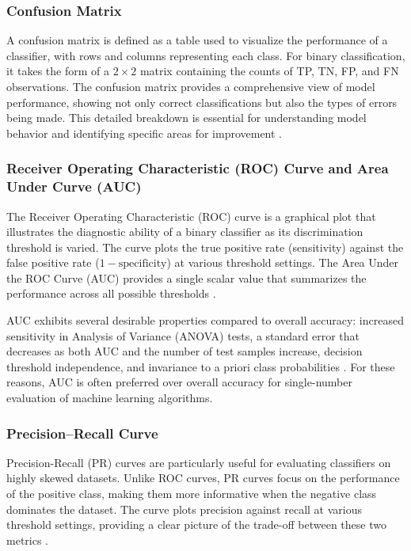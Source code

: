 \documentclass[12pt, a4paper]{report}
\begin{document}
\subsubsection{Confusion Matrix}
A confusion matrix is defined as a table used to visualize the performance of a classifier, with rows and columns representing each class. For binary classification, it takes the form of a $2 \times 2$ matrix containing the counts of TP, TN, FP, and FN observations. The confusion matrix provides a comprehensive view of model performance, showing not only correct classifications but also the types of errors being made. This detailed breakdown is essential for understanding model behavior and identifying specific areas for improvement .

\subsubsection{Receiver Operating Characteristic (ROC) Curve and Area Under Curve (AUC)}
The Receiver Operating Characteristic (ROC) curve is a graphical plot that illustrates the diagnostic ability of a binary classifier as its discrimination threshold is varied. The curve plots the true positive rate (sensitivity) against the false positive rate ($1 - \text{specificity}$) at various threshold settings. The Area Under the ROC Curve (AUC) provides a single scalar value that summarizes the performance across all possible thresholds .

AUC exhibits several desirable properties compared to overall accuracy: increased sensitivity in Analysis of Variance (ANOVA) tests, a standard error that decreases as both AUC and the number of test samples increase, decision threshold independence, and invariance to a priori class probabilities . For these reasons, AUC is often preferred over overall accuracy for single-number evaluation of machine learning algorithms.

\subsubsection{Precision--Recall Curve}
Precision-Recall (PR) curves are particularly useful for evaluating classifiers on highly skewed datasets. Unlike ROC curves, PR curves focus on the performance of the positive class, making them more informative when the negative class dominates the dataset. The curve plots precision against recall at various threshold settings, providing a clear picture of the trade-off between these two metrics .
\end{document}
